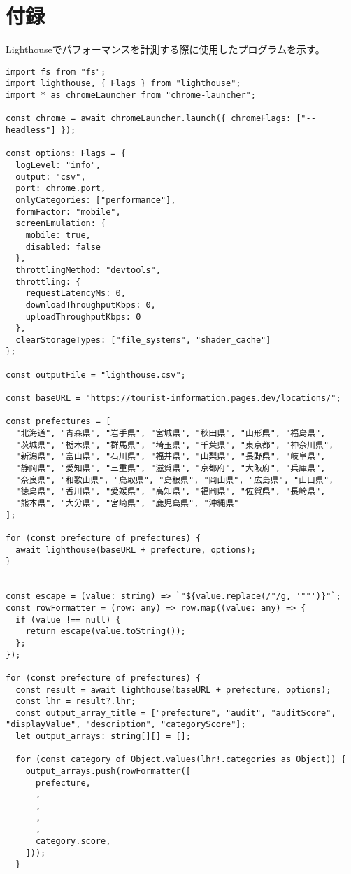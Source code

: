 \section*{付録}
Lighthouseでパフォーマンスを計測する際に使用したプログラムを示す。
\begin{lstlisting}
import fs from "fs";
import lighthouse, { Flags } from "lighthouse";
import * as chromeLauncher from "chrome-launcher";

const chrome = await chromeLauncher.launch({ chromeFlags: ["--headless"] });

const options: Flags = {
  logLevel: "info",
  output: "csv",
  port: chrome.port,
  onlyCategories: ["performance"],
  formFactor: "mobile",
  screenEmulation: {
    mobile: true,
    disabled: false
  },
  throttlingMethod: "devtools",
  throttling: {
    requestLatencyMs: 0,
    downloadThroughputKbps: 0,
    uploadThroughputKbps: 0
  },
  clearStorageTypes: ["file_systems", "shader_cache"]
};

const outputFile = "lighthouse.csv";

const baseURL = "https://tourist-information.pages.dev/locations/";

const prefectures = [
  "北海道", "青森県", "岩手県", "宮城県", "秋田県", "山形県", "福島県",
  "茨城県", "栃木県", "群馬県", "埼玉県", "千葉県", "東京都", "神奈川県",
  "新潟県", "富山県", "石川県", "福井県", "山梨県", "長野県", "岐阜県",
  "静岡県", "愛知県", "三重県", "滋賀県", "京都府", "大阪府", "兵庫県",
  "奈良県", "和歌山県", "鳥取県", "島根県", "岡山県", "広島県", "山口県",
  "徳島県", "香川県", "愛媛県", "高知県", "福岡県", "佐賀県", "長崎県",
  "熊本県", "大分県", "宮崎県", "鹿児島県", "沖縄県"
];

for (const prefecture of prefectures) {
  await lighthouse(baseURL + prefecture, options);
}


const escape = (value: string) => `"${value.replace(/"/g, '""')}"`;
const rowFormatter = (row: any) => row.map((value: any) => {
  if (value !== null) {
    return escape(value.toString());
  };
});

for (const prefecture of prefectures) {
  const result = await lighthouse(baseURL + prefecture, options);
  const lhr = result?.lhr;
  const output_array_title = ["prefecture", "audit", "auditScore", "displayValue", "description", "categoryScore"];
  let output_arrays: string[][] = [];

  for (const category of Object.values(lhr!.categories as Object)) {
    output_arrays.push(rowFormatter([
      prefecture,
      ,
      ,
      ,
      ,
      category.score,
    ]));
  }


\end{lstlisting}

